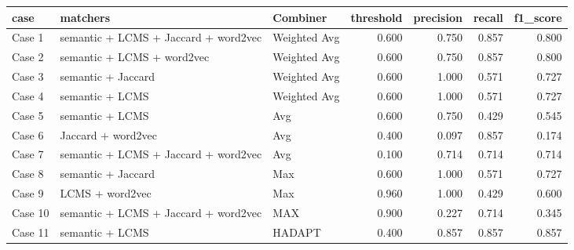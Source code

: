 \begin{tabular}{lllrrrr}
\toprule
case & matchers & Combiner & threshold & precision & recall & f1_score \\
\midrule
Case 1 & semantic + LCMS + Jaccard + word2vec & Weighted Avg & 0.600 & 0.750 & 0.857 & 0.800 \\
Case 2 & semantic + LCMS + word2vec & Weighted Avg & 0.600 & 0.750 & 0.857 & 0.800 \\
Case 3 & semantic + Jaccard & Weighted Avg & 0.600 & 1.000 & 0.571 & 0.727 \\
Case 4 & semantic + LCMS & Weighted Avg & 0.600 & 1.000 & 0.571 & 0.727 \\
Case 5 & semantic + LCMS & Avg & 0.600 & 0.750 & 0.429 & 0.545 \\
Case 6 & Jaccard + word2vec & Avg & 0.400 & 0.097 & 0.857 & 0.174 \\
Case 7 & semantic + LCMS + Jaccard + word2vec & Avg & 0.100 & 0.714 & 0.714 & 0.714 \\
Case 8 & semantic + Jaccard & Max & 0.600 & 1.000 & 0.571 & 0.727 \\
Case 9 & LCMS + word2vec & Max & 0.960 & 1.000 & 0.429 & 0.600 \\
Case 10 & semantic + LCMS + Jaccard + word2vec & MAX & 0.900 & 0.227 & 0.714 & 0.345 \\
Case 11 & semantic + LCMS & HADAPT & 0.400 & 0.857 & 0.857 & 0.857 \\
\bottomrule
\end{tabular}
